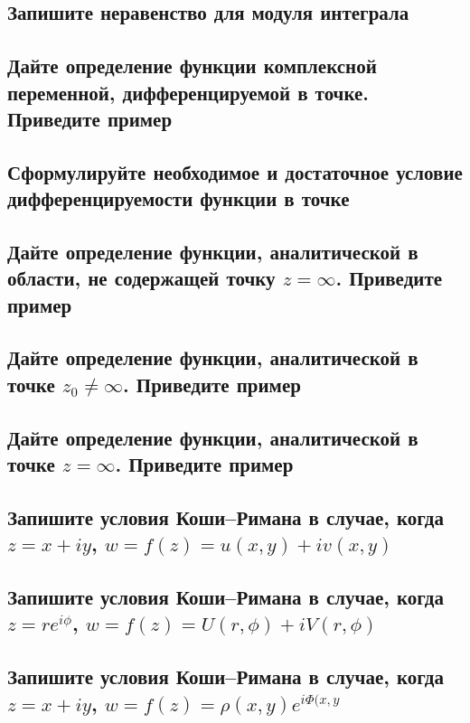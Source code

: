 \subsection{Запишите неравенство для модуля интеграла}

\subsection{Дайте определение функции комплексной переменной, дифференцируемой в точке. Приведите пример}

\subsection{Сформулируйте необходимое и достаточное условие дифференцируемости функции в точке}

\subsection{Дайте определение функции, аналитической в области, не содержащей точку $z=\infty$. Приведите пример}

\subsection{Дайте определение функции, аналитической в точке $z_0 \neq \infty$. Приведите пример}

\subsection{Дайте определение функции, аналитической в точке $z = \infty$. Приведите пример}

\subsection{Запишите условия Коши–Римана в случае, когда $z = x+iy$, $w = f(z) = u(x, y)+iv(x, y)$}

\subsection{Запишите условия Коши–Римана в случае, когда $z = re^{i\phi}$, $w = f(z) = U(r, \phi)+iV (r, \phi)$}

\subsection{Запишите условия Коши–Римана в случае, когда $z = x + iy$, $w = f(z) = \rho(x, y)e^{i\Phi(x,y}$}

